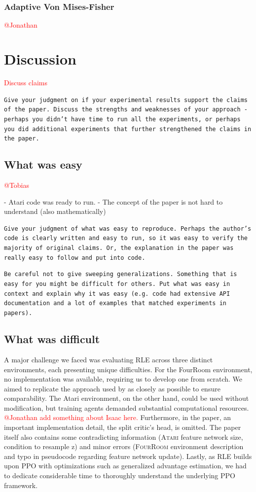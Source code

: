\documentclass[10pt]{article} %
\begin{document}
\subsubsection{Adaptive Von Mises-Fisher}
\textcolor{red}{@Jonathan}


\section{Discussion}
\textcolor{red}{Discuss claims}


\texttt{Give your judgment on if your experimental results support the claims of the paper. Discuss the strengths and weaknesses of your approach - perhaps you didn't have time to run all the experiments, or perhaps you did additional experiments that further strengthened the claims in the paper.}

\subsection{What was easy}
\textcolor{red}{@Tobias}

- Atari code was ready to run. 
- The concept of the paper is not hard to understand (also mathematically)

\texttt{Give your judgment of what was easy to reproduce. Perhaps the author's code is clearly written and easy to run, so it was easy to verify the majority of original claims. Or, the explanation in the paper was really easy to follow and put into code.}

\texttt{Be careful not to give sweeping generalizations. Something that is easy for you might be difficult for others. Put what was easy in context and explain why it was easy (e.g. code had extensive API documentation and a lot of examples that matched experiments in papers).}

\subsection{What was difficult}
A major challenge we faced was evaluating RLE across three distinct environments, each presenting unique difficulties. For the FourRoom environment, no implementation was available, requiring us to develop one from scratch. We aimed to replicate the approach used by \cite{rle-paper} as closely as possible to ensure comparability. The Atari environment, on the other hand, could be used without modification, but training agents demanded substantial computational resources. \textcolor{red}{@Jonathan add something about Isaac here.} Furthermore, in the paper, an important implementation detail, the split critic's head, is omitted. The paper itself also contains some contradicting information (\textsc{Atari} feature network size, condition to resample z) and minor errors (\textsc{FourRoom} environment description and typo in pseudocode regarding feature network update). Lastly, as RLE builds upon PPO with optimizations such as generalized advantage estimation, we had to dedicate considerable time to thoroughly understand the underlying PPO framework. 
\end{document}
